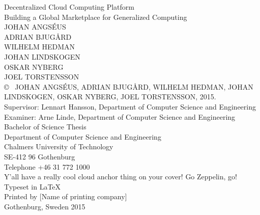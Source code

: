 \newpage
\thispagestyle{plain}
\vspace*{4.5cm}
\noindent Decentralized Cloud Computing Platform\\
Building a Global Marketplace for Generalized Computing\\
JOHAN ANGSÉUS\\
ADRIAN BJUGÅRD\\
WILHELM HEDMAN\\
JOHAN LINDSKOGEN\\
OSKAR NYBERG\\
JOEL TORSTENSSON\\[0.5cm]

\noindent \copyright ~ JOHAN ANGSÉUS, ADRIAN BJUGÅRD, WILHELM HEDMAN, JOHAN LINDSKOGEN, OSKAR NYBERG, JOEL TORSTENSSON, 2015.\\[0.5cm]

\noindent Supervisor: Lennart Hansson, Department of Computer Science and Engineering\\
Examiner: Arne Linde, Department of Computer Science and Engineering
\\[0.5cm]

\noindent Bachelor of Science Thesis\\
Department of Computer Science and Engineering\\
Chalmers University of Technology\\
SE-412 96 Gothenburg\\
Telephone +46 31 772 1000\\

\vfill
\noindent Y'all have a really cool cloud anchor thing on your cover! Go Zeppelin, go! \\

\noindent Typeset in \LaTeX \\
Printed by [Name of printing company]\\
Gothenburg, Sweden 2015
